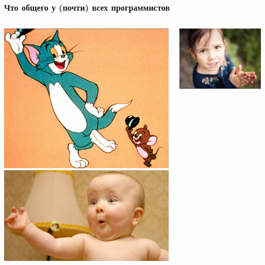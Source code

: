 \documentclass[10pt,pdf,hyperref={unicode}]{beamer}
\begin{document}
\begin{frame}
\frametitle{Что общего у (почти) всех программистов} 

\begin{columns}
%
\includegraphics[width=1.1\textwidth]{./vostorg2.png}
\includegraphics[width=1.1\textwidth]{./child01.png}

\includegraphics[width=1.1\textwidth]{./child02.png}
\end{columns}

\end{frame}
\end{document}
